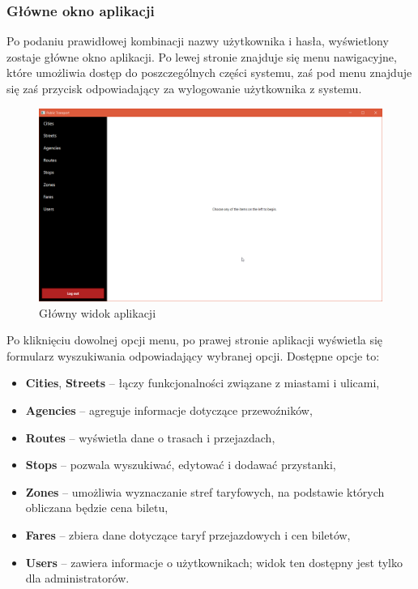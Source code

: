\documentclass[10pt,a4paper]{article}
\begin{document}
\subsubsection{Główne okno aplikacji}
Po podaniu prawidłowej kombinacji nazwy użytkownika i hasła, wyświetlony zostaje główne okno aplikacji. Po lewej stronie znajduje się menu nawigacyjne, które umożliwia dostęp do poszczególnych części systemu, zaś pod menu znajduje się zaś przycisk odpowiadający za wylogowanie użytkownika z systemu.
\begin{figure}[H]
	\centering
	\includegraphics[width=15cm]{screenshots/02_main_window.png}
	\caption{Główny widok aplikacji}
\end{figure}
Po kliknięciu dowolnej opcji menu, po prawej stronie aplikacji wyświetla się formularz wyszukiwania odpowiadający wybranej opcji. Dostępne opcje to:
\begin{itemize}
	\item \textbf{Cities}, \textbf{Streets} -- łączy funkcjonalności związane z miastami i ulicami,
	\item \textbf{Agencies} -- agreguje informacje dotyczące przewoźników,
	\item \textbf{Routes} -- wyświetla dane o trasach i przejazdach,
	\item \textbf{Stops} -- pozwala wyszukiwać, edytować i dodawać przystanki,
	\item \textbf{Zones} -- umożliwia wyznaczanie stref taryfowych, na podstawie których obliczana będzie cena biletu,
	\item \textbf{Fares} -- zbiera dane dotyczące taryf przejazdowych i cen biletów,
	\item \textbf{Users} -- zawiera informacje o użytkownikach; widok ten dostępny jest tylko dla administratorów.
\end{itemize}
\end{document}
